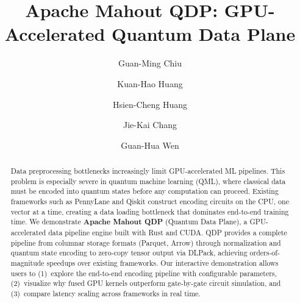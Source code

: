 \documentclass[sigconf, nonacm]{acmart}
\begin{document}
\title{Apache Mahout QDP: GPU-Accelerated Quantum Data Plane}

\author{Guan-Ming Chiu}

\author{Kuan-Hao Huang}
\authornotemark[1]

\author{Hsien-Cheng Huang}
\authornotemark[1]

\author{Jie-Kai Chang}
\authornotemark[1]

\author{Guan-Hua Wen}

\begin{abstract}
Data preprocessing bottlenecks increasingly limit GPU-accelerated ML pipelines.
This problem is especially severe in quantum machine learning (QML), where classical data must be encoded into quantum states before any computation can proceed.
Existing frameworks such as PennyLane and Qiskit construct encoding circuits on the CPU, one vector at a time, creating a data loading bottleneck that dominates end-to-end training time.
We demonstrate \textbf{Apache Mahout QDP} (Quantum Data Plane), a GPU-accelerated data pipeline engine built with Rust and CUDA.
QDP provides a complete pipeline from columnar storage formats (Parquet, Arrow) through normalization and quantum state encoding to zero-copy tensor output via DLPack, achieving orders-of-magnitude speedups over existing frameworks.
Our interactive demonstration allows users to (1)~explore the end-to-end encoding pipeline with configurable parameters, (2)~visualize why fused GPU kernels outperform gate-by-gate circuit simulation, and (3)~compare latency scaling across frameworks in real time.
\end{abstract}

\maketitle
\end{document}
